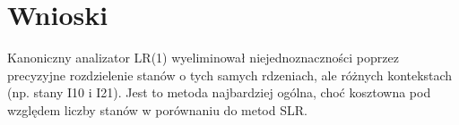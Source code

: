 \documentclass[11pt, a4paper]{article}
\begin{document}
\section{Wnioski}
Kanoniczny analizator LR(1) wyeliminował niejednoznaczności poprzez precyzyjne rozdzielenie stanów o tych samych rdzeniach, ale różnych kontekstach (np. stany I10 i I21). Jest to metoda najbardziej ogólna, choć kosztowna pod względem liczby stanów w porównaniu do metod SLR.
\end{document}
